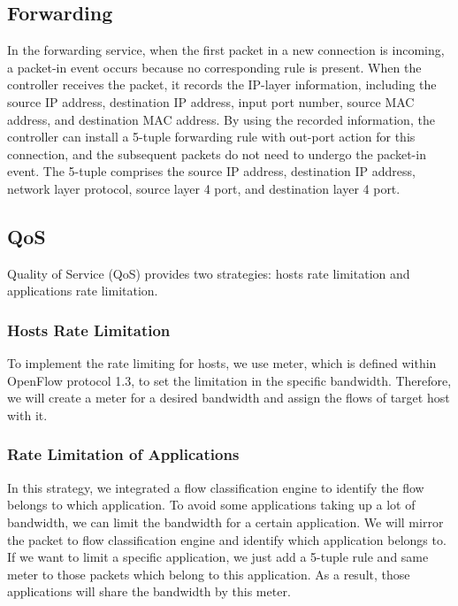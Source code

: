 \documentclass[conference]{IEEEtran}
\begin{document}
\subsection{Forwarding} \label{ssec:forwarding}
In the forwarding service, when the first packet in a new connection is incoming, a packet-in event occurs because no corresponding rule is present.
When the controller receives the packet, it records the IP-layer information, including the source IP address, destination IP address, input port number, source MAC address, and destination MAC address.
By using the recorded information, the controller can install a 5-tuple forwarding rule with out-port action for this connection, and the subsequent packets do not need to undergo the packet-in event.
The 5-tuple comprises the source IP address, destination IP address, network layer protocol, source layer 4 port, and destination layer 4 port.



\subsection{QoS}
Quality of Service (QoS) provides two strategies: hosts rate limitation and applications rate limitation.

\subsubsection{Hosts Rate Limitation}
To implement the rate limiting for hosts, we use meter, which is defined within OpenFlow protocol 1.3, to set the limitation in the specific bandwidth. Therefore, we will create a meter for a desired bandwidth and assign the flows of target host with it.


\subsubsection{Rate Limitation of Applications}

In this strategy, we integrated a flow classification engine to identify the flow belongs to which application.
To avoid some applications taking up a lot of bandwidth, we can limit the bandwidth for a certain application.
We will mirror the packet to flow classification engine and identify which application belongs to.
If we want to limit a specific application, we just add a 5-tuple rule and same meter to those packets which belong to this application.
As a result, those applications will share the bandwidth by this meter.
\end{document}
